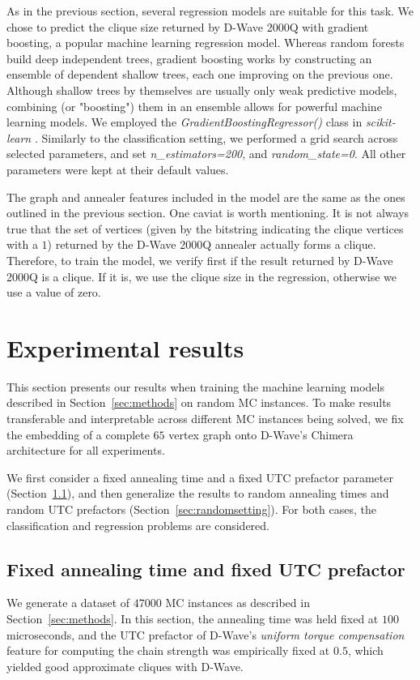 \documentclass[a4paper,11pt]{article}
\begin{document}
As in the previous section, several regression models are suitable for this task. We chose to predict the clique size returned by D-Wave 2000Q with gradient boosting, a popular machine learning regression model. Whereas random forests build deep independent trees, gradient boosting works by constructing an ensemble of dependent shallow trees, each one improving on the previous one. Although shallow trees by themselves are usually only weak predictive models, combining (or "boosting") them in an ensemble allows for powerful machine learning models. We employed the \textit{GradientBoostingRegressor()} class \cite{gradientboosting} in \textit{scikit-learn} \cite{scikit-learn}. Similarly to the classification setting, we performed a grid search across selected parameters, and set \textit{n\_estimators=200}, and \textit{random\_state=0}. All other parameters were kept at their default values.

The graph and annealer features included in the model are the same as the ones outlined in the previous section. One caviat is worth mentioning. It is not always true that the set of vertices (given by the bitstring indicating the clique vertices with a $1$) returned by the D-Wave 2000Q annealer actually forms a clique. Therefore, to train the model, we verify first if the result returned by D-Wave 2000Q is a clique. If it is, we use the clique size in the regression, otherwise we use a value of zero.



\section{Experimental results}
\label{sec:experiments}
This section presents our results when training the machine learning models described in Section~\ref{sec:methods} on random MC instances. To make results transferable and interpretable across different MC instances being solved, we fix the embedding of a complete $65$ vertex graph onto D-Wave's Chimera architecture for all experiments.

We first consider a fixed annealing time and a fixed UTC prefactor parameter (Section~\ref{sec:fixedsetting}), and then generalize the results to random annealing times and random UTC prefactors (Section~\ref{sec:randomsetting}). For both cases, the classification and regression problems are considered.

\subsection{Fixed annealing time and fixed UTC prefactor}
\label{sec:fixedsetting}
We generate a dataset of $47000$ MC instances as described in Section~\ref{sec:methods}. In this section, the annealing time was held fixed at $100$ microseconds, and the UTC prefactor of D-Wave's \textit{uniform torque compensation} feature for computing the chain strength was empirically fixed at $0.5$, which yielded good approximate cliques with D-Wave.
\end{document}
